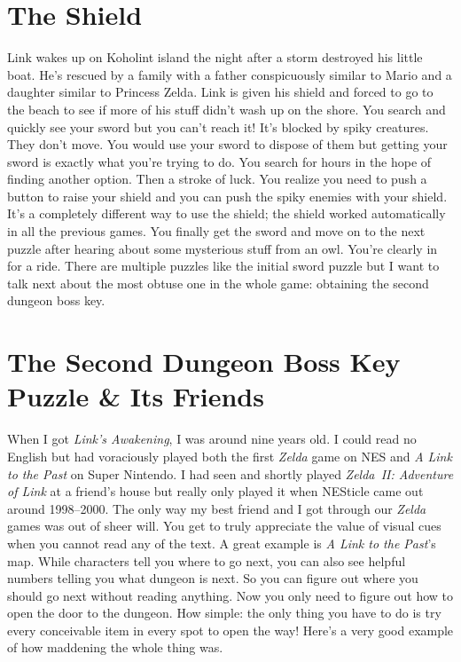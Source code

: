 \documentclass{book}
\begin{document}
\FloatBarrier\vspace{\baselineskip}\begin{figure}[H]\end{figure}
\FloatBarrier\section*{The Shield}
Link wakes up on Koholint island the night after a storm destroyed his little boat. He’s rescued by a family with a father conspicuously similar to Mario and a daughter similar to Princess Zelda. Link is given his shield and forced to go to the beach to see if more of his stuff didn’t wash up on the shore. You search and quickly see your sword but you can’t reach it! It’s blocked by spiky creatures. They don’t move. You would use your sword to dispose of them but getting your sword is exactly what you’re trying to do. You search for hours in the hope of finding another option. Then a stroke of luck. You realize you need to push a button to raise your shield and you can push the spiky enemies with your shield. It’s a completely different way to use the shield; the shield worked automatically in all the previous games. You finally get the sword and move on to the next puzzle after hearing about some mysterious stuff from an owl. You’re clearly in for a ride. There are multiple puzzles like the initial sword puzzle but I want to talk next about the most obtuse one in the whole game: obtaining the second dungeon boss key.\par
\FloatBarrier\vspace{\baselineskip}\begin{figure}[H]\end{figure}
\FloatBarrier\section*{The Second Dungeon Boss Key Puzzle \& Its Friends}
When I got \emph{Link’s Awakening}, I was around nine years old. I could read no English but had voraciously played both the first \emph{Zelda} game on NES and \emph{A Link to the Past} on Super Nintendo. I had seen and shortly played \emph{Zelda~II: Adventure of Link} at a friend’s house but really only played it when NESticle came out around 1998–2000. The only way my best friend and I got through our \emph{Zelda} games was out of sheer will. You get to truly appreciate the value of visual cues when you cannot read any of the text. A great example is \emph{A Link to the Past}’s map. While characters tell you where to go next, you can also see helpful numbers telling you what dungeon is next. So you can figure out where you should go next without reading anything. Now you only need to figure out how to open the door to the dungeon. How simple: the only thing you have to do is try every conceivable item in every spot to open the way! Here’s a very good example of how maddening the whole thing was.\par
\end{document}
